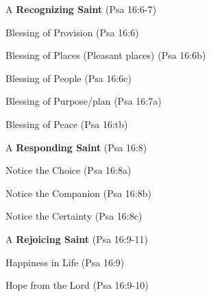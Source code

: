 \begin{compactenum}[I.][8]
	\item A \textbf{Recognizing Saint}  (Psa 16:6-7)
	\begin{compactenum}[A.][8]
	    \item Blessing of Provision (Psa 16:6)
	    \item Blessing of Places (Pleasant places) (Psa 16:6b)
	    \item Blessing of People (Psa 16:6c)
	    \item Blessing of Purpose/plan (Psa 16:7a)
	    \item Blessing of Peace (Psa 16:tb)
    \end{compactenum}
	\item A \textbf{Responding Saint}  (Psa 16:8)
	\begin{compactenum}[A.][8]
	    \item Notice the Choice (Psa 16:8a)
	    \item Notice the Companion (Psa 16:8b)
	    \item Notice the Certainty (Psa 16:8c)
    \end{compactenum}
	\item A \textbf{Rejoicing Saint}  (Psa 16:9-11)
	\begin{compactenum}[A.][8]
	    \item Happiness in Life  (Psa 16:9)
	    \item Hope from the Lord  (Psa 16:9-10)
    \end{compactenum}
\end{compactenum}


